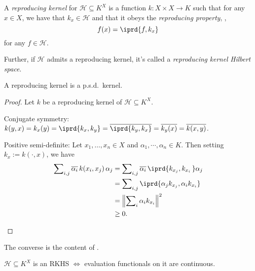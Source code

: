 	\begin{dfn}
		A \emph{reproducing kernel} for $\mathscr H\subseteq K^X$ is a function $k\colon X\times X\to K$ such that for any $x\in X$, we have that $k_x\in\mathscr H$ and that it obeys the \emph{reproducing property}, \ie,
		\[
		f(x) = \iprd{f, k_x}
		\]
		for any $f\in\mathscr H$.
		
		Further, if $\mathscr H$ admits a reproducing kernel, it's called a \emph{reproducing kernel Hilbert space}.
	\end{dfn}
	
	
	\begin{lem}\label{LEM: repr kernel is a psd kernel}
		A reproducing kernel is a p.s.d.\ kernel.
	\end{lem}
	
	\begin{proof}
		Let $k$ be a reproducing kernel of $\mathscr H\subseteq K^X$.
		\begin{prooflist}
			\item Conjugate symmetry: $k(y, x) = k_x(y) = \iprd{k_x, k_y} = \overline{\iprd{k_y, k_x}} = \overline{k_y(x)} = \overline{k(x, y)}$.
			
			\item Positive semi-definite: Let $x_1, \ldots, x_n\in X$ and $\alpha_1, \cdots, \alpha_n\in K$. Then setting $k_x := k(\cdot, x)$, we have
			\begin{align*}
				\sum\nolimits_{i, j} \overline{\alpha_i}\, k(x_i, x_j)\, \alpha_j 
				& = \sum\nolimits_{i, j} \overline{\alpha_i}\, \iprd{ k_{x_j}, k_{x_i}\, } \alpha_j\\
				& = \sum\nolimits_{i, j} \iprd{\alpha_j k_{x_j}, \alpha_i k_{x_i}}\\
				& = \left\Vert \sum\nolimits_i \alpha_i k_{x_i} \right\Vert^2\\
				& \ge 0\text.\qedhere
			\end{align*}
		\end{prooflist}
	\end{proof}
	
	\begin{rmk}
		The converse is the content of .
	\end{rmk}
	
	
	\begin{lem}
		$\mathscr H\subseteq K^X$ is an RKHS $\iff$ evaluation functionals on it are continuous.
	\end{lem}
	
